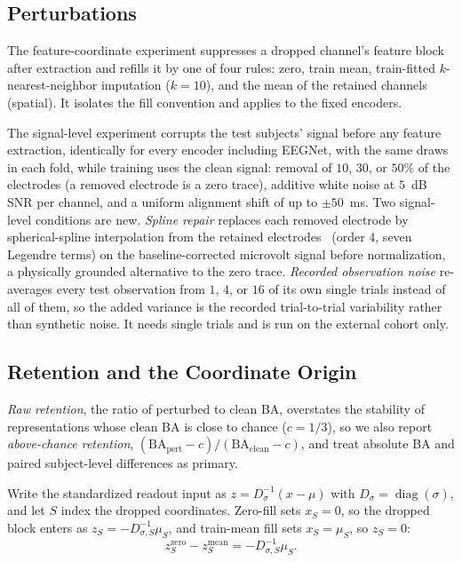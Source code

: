 \documentclass[journal]{IEEEtran}
\begin{document}
\subsection{Perturbations}
\label{sec:perturb-methods}
The feature-coordinate experiment suppresses a dropped channel's feature block after extraction and refills it by one of four rules: zero, train mean, train-fitted $k$-nearest-neighbor imputation ($k{=}10$), and the mean of the retained channels (spatial). It isolates the fill convention and applies to the fixed encoders.

The signal-level experiment corrupts the test subjects' signal before any feature extraction, identically for every encoder including EEGNet, with the same draws in each fold, while training uses the clean signal: removal of $10$, $30$, or $50\%$ of the electrodes (a removed electrode is a zero trace), additive white noise at $5$~dB SNR per channel, and a uniform alignment shift of up to $\pm50$~ms. Two signal-level conditions are new. \emph{Spline repair} replaces each removed electrode by spherical-spline interpolation from the retained electrodes~\cite{perrin1989spherical} (order $4$, seven Legendre terms) on the baseline-corrected microvolt signal before normalization, a physically grounded alternative to the zero trace. \emph{Recorded observation noise} re-averages every test observation from $1$, $4$, or $16$ of its own single trials instead of all of them, so the added variance is the recorded trial-to-trial variability rather than synthetic noise. It needs single trials and is run on the external cohort only.

\subsection{Retention and the Coordinate Origin}
\label{sec:confound}
\emph{Raw retention}, the ratio of perturbed to clean BA, overstates the stability of representations whose clean BA is close to chance ($c=1/3$), so we also report \emph{above-chance retention}, $(\mathrm{BA}_{\mathrm{pert}}-c)/(\mathrm{BA}_{\mathrm{clean}}-c)$, and treat absolute BA and paired subject-level differences as primary.

Write the standardized readout input as $z=D_\sigma^{-1}(x-\mu)$ with $D_\sigma=\operatorname{diag}(\sigma)$, and let $S$ index the dropped coordinates. Zero-fill sets $x_S=0$, so the dropped block enters as $z_S=-D_{\sigma,S}^{-1}\mu_S$, and train-mean fill sets $x_S=\mu_S$, so $z_S=0$:
\begin{equation}\label{eq:noninv}
z_S^{\mathrm{zero}}-z_S^{\mathrm{mean}}=-D_{\sigma,S}^{-1}\mu_S .
\end{equation}
\end{document}
